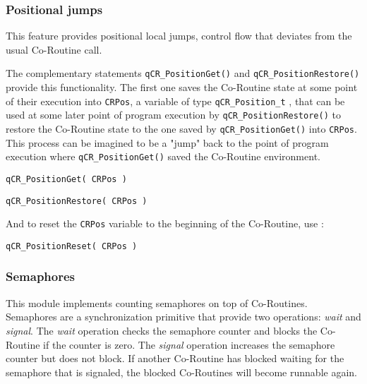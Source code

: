 \subsubsection{Positional jumps}
This feature provides positional local jumps, control flow that deviates from the usual Co-Routine call. 

The complementary statements \lstinline{qCR_PositionGet()}  and \lstinline{qCR_PositionRestore()}  provide this functionality.
The first one saves the Co-Routine state at some point of their execution into \lstinline{CRPos}, a variable of type \lstinline{qCR_Position_t} ,  that can be used at some later point of program execution by \lstinline{qCR_PositionRestore()} to restore the Co-Routine  state to the one saved by \lstinline{qCR_PositionGet()} into \lstinline{CRPos}. This process can be imagined to be a "jump" back to the point of program execution where \lstinline{qCR_PositionGet()} saved the Co-Routine  environment.
\medskip

\begin{lstlisting}[style=CStyle]
qCR_PositionGet( CRPos )
\end{lstlisting}

\begin{lstlisting}[style=CStyle]
qCR_PositionRestore( CRPos )
\end{lstlisting}

And to reset the \lstinline{CRPos} variable to the beginning of the Co-Routine, use :

\begin{lstlisting}[style=CStyle]
qCR_PositionReset( CRPos )
\end{lstlisting}

\subsubsection{Semaphores}
This module implements counting semaphores on top of Co-Routines. Semaphores are a synchronization primitive that provide two operations: \textit{wait} and \textit{signal}. The \textit{wait} operation checks the semaphore counter and blocks the Co-Routine if the counter is zero. The \textit{signal} operation increases the semaphore counter but does not block. If another Co-Routine has blocked waiting for the semaphore that is signaled, the blocked Co-Routines will become runnable again.

